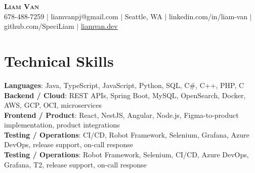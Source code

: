 \documentclass[letterpaper,11pt]{article}
\begin{document}

%
\begin{center}
    \textbf{\Huge \scshape Liam Van} \\ \vspace{1pt}
    \small 678-488-7259 $|$ liamvanpj@gmail.com $|$ Seattle, WA $|$
    linkedin.com/in/liam-van $|$ github.com/SpeciLiam $|$ \href{https://liamvan.dev}{liamvan.dev}

\end{center}

\section{Technical Skills}
 \begin{itemize}[leftmargin=0.15in, label={}]
    \small{\item{
     \textbf{Languages}{: Java, TypeScript, JavaScript, Python, SQL, C\#, C++, PHP, C} \\
     \textbf{Backend / Cloud}{: REST APIs, Spring Boot, MySQL, OpenSearch, Docker, AWS, GCP, OCI, microservices} \\
     \textbf{Frontend / Product}{: React, NestJS, Angular, Node.js, Figma-to-product implementation, product integrations} \\
     \textbf{Testing / Operations}{: CI/CD, Robot Framework, Selenium, Grafana, Azure DevOps, release support, on-call response} \\
     \textbf{Testing / Operations}{: Robot Framework, Selenium, CI/CD, Azure DevOps, Grafana, T2, release support, on-call response} \\
    }}
 \end{itemize}
%
\end{document}

